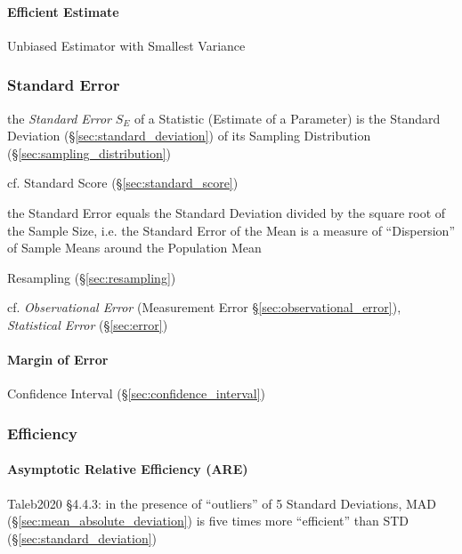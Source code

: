 \paragraph{Efficient Estimate}\label{sec:efficient_estimate}\hfill

Unbiased Estimator with Smallest Variance



\subsubsection{Standard Error}\label{sec:standard_error}

the \emph{Standard Error} $S_E$ of a Statistic (Estimate of a Parameter) is the
Standard Deviation (\S\ref{sec:standard_deviation}) of its Sampling Distribution
(\S\ref{sec:sampling_distribution})

cf. Standard Score (\S\ref{sec:standard_score})

the Standard Error equals the Standard Deviation divided by the square root of
the Sample Size, i.e. the Standard Error of the Mean is a measure of
``Dispersion'' of Sample Means around the Population Mean

\fist Resampling (\S\ref{sec:resampling})

\fist cf. \emph{Observational Error} (Measurement Error
\S\ref{sec:observational_error}), \emph{Statistical Error} (\S\ref{sec:error})



\paragraph{Margin of Error}\label{sec:margin_of_error}\hfill

\fist Confidence Interval (\S\ref{sec:confidence_interval})



\subsubsection{Efficiency}\label{sec:efficiency}

\paragraph{Asymptotic Relative Efficiency (ARE)}\label{sec:are}\hfill

Taleb2020 \S 4.4.3: in the presence of ``outliers'' of 5 Standard Deviations,
MAD (\S\ref{sec:mean_absolute_deviation}) is five times more ``efficient'' than
STD (\S\ref{sec:standard_deviation})



